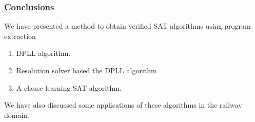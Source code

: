 \documentclass{beamer}
\begin{document}
\begin{frame}
\frametitle{Conclusions}
We have presented a method to obtain verified SAT algorithms using program extraction

\begin{enumerate}

\item  DPLL algorithm.

\item  Resolution solver based the DPLL algorithm

\item  A clause learning SAT algorithm.

\end{enumerate}

We have also discussed some applications of these algorithms in the railway domain.

\end{frame}
\end{document}
